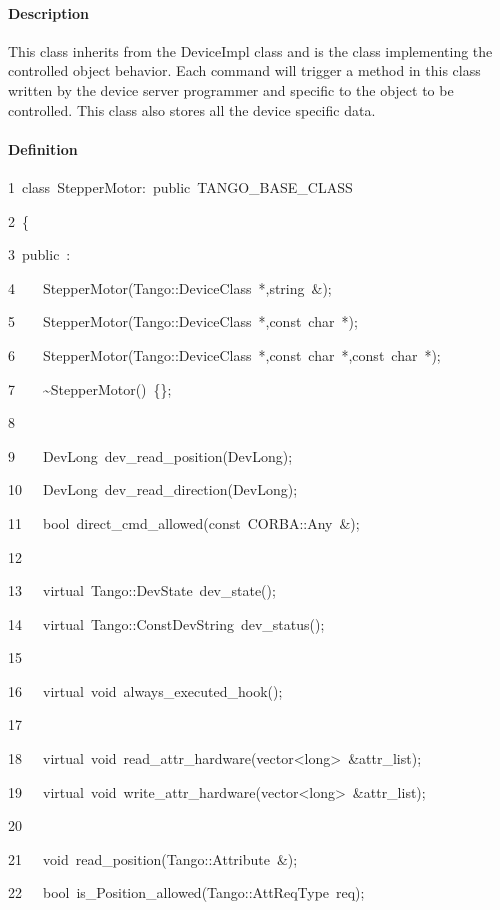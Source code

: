 \paragraph{Description}

This class inherits from the DeviceImpl class and
is the class implementing the controlled object behavior. Each command
will trigger a method in this class written by the device server programmer
and specific to the object to be controlled. This class also stores
all the device specific data.


\paragraph{Definition}


\begin{lyxcode}
1~class~StepperMotor:~public~TANGO\_BASE\_CLASS

2~\{

3~public~:

4~~~~StepperMotor(Tango::DeviceClass~{*},string~\&);

5~~~~StepperMotor(Tango::DeviceClass~{*},const~char~{*});

6~~~~StepperMotor(Tango::DeviceClass~{*},const~char~{*},const~char~{*});

7~~~~\textasciitilde{}StepperMotor()~\{\};

8~

9~~~~DevLong~dev\_read\_position(DevLong);

10~~~DevLong~dev\_read\_direction(DevLong);

11~~~bool~direct\_cmd\_allowed(const~CORBA::Any~\&);

12~

13~~~virtual~Tango::DevState~dev\_state();

14~~~virtual~Tango::ConstDevString~dev\_status();

15~

16~~~virtual~void~always\_executed\_hook();

17~

18~~~virtual~void~read\_attr\_hardware(vector<long>~\&attr\_list);

19~~~virtual~void~write\_attr\_hardware(vector<long>~\&attr\_list);

20~

21~~~void~read\_position(Tango::Attribute~\&);

22~~~bool~is\_Position\_allowed(Tango::AttReqType~req);


\end{lyxcode}
